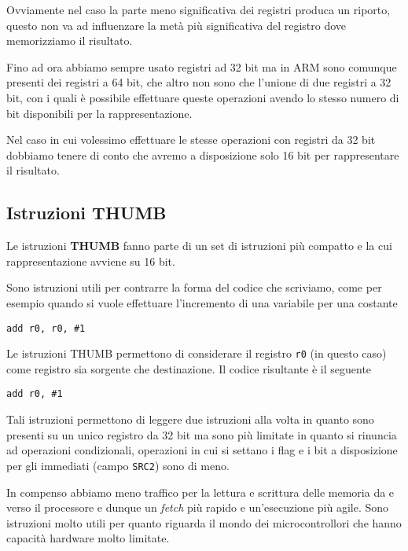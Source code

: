 Ovviamente nel caso la parte meno significativa dei registri produca un riporto, questo non va ad
influenzare la metà più significativa del registro dove memorizziamo il risultato.

Fino ad ora abbiamo sempre usato registri ad 32 bit ma in ARM sono comunque presenti dei registri
a 64 bit, che altro non sono che l'unione di due registri a 32 bit, con i quali è possibile
effettuare queste operazioni avendo lo stesso numero di bit disponibili per la rappresentazione.

Nel caso in cui volessimo effettuare le stesse operazioni con registri da 32 bit dobbiamo tenere di
conto che avremo a disposizione solo 16 bit per rappresentare il risultato.

\subsection{Istruzioni THUMB}
Le istruzioni \textbf{THUMB} fanno parte di un set di istruzioni più compatto e la cui
rappresentazione avviene su 16 bit.

Sono istruzioni utili per contrarre la forma del codice che scriviamo, come per esempio quando si
vuole effettuare l'incremento di una variabile per una costante
\begin{verbatim}
add r0, r0, #1
\end{verbatim}
Le istruzioni THUMB permettono di considerare il registro \verb|r0| (in questo caso) come registro
sia sorgente che destinazione. Il codice risultante è il seguente
\begin{verbatim}
add r0, #1
\end{verbatim}
Tali istruzioni permettono di leggere due istruzioni alla volta in quanto sono presenti su un unico
registro da 32 bit ma sono più limitate in quanto si rinuncia ad operazioni condizionali,
operazioni in cui si settano i flag e i bit a disposizione per gli immediati (campo \verb|SRC2|)
sono di meno.

In compenso abbiamo meno traffico per la lettura e scrittura delle memoria da e verso il processore
e dunque un \emph{fetch} più rapido e un'esecuzione più agile. Sono istruzioni molto utili per
quanto riguarda il mondo dei microcontrollori che hanno capacità hardware molto limitate.
